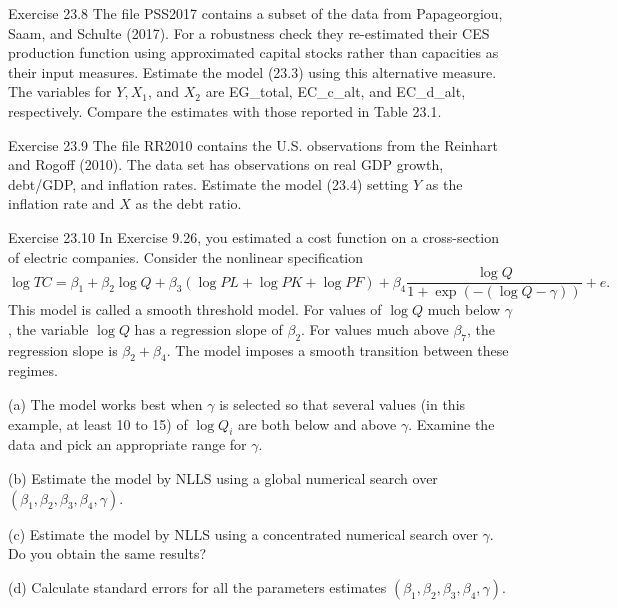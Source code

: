 \documentclass[10pt]{article}
\begin{document}
Exercise 23.8 The file PSS2017 contains a subset of the data from Papageorgiou, Saam, and Schulte (2017). For a robustness check they re-estimated their CES production function using approximated capital stocks rather than capacities as their input measures. Estimate the model (23.3) using this alternative measure. The variables for $Y, X_{1}$, and $X_{2}$ are EG\_total, EC\_c\_alt, and EC\_d\_alt, respectively. Compare the estimates with those reported in Table 23.1.

Exercise 23.9 The file RR2010 contains the U.S. observations from the Reinhart and Rogoff (2010). The data set has observations on real GDP growth, debt/GDP, and inflation rates. Estimate the model (23.4) setting $Y$ as the inflation rate and $X$ as the debt ratio.

Exercise 23.10 In Exercise 9.26, you estimated a cost function on a cross-section of electric companies. Consider the nonlinear specification
$$
\log T C=\beta_{1}+\beta_{2} \log Q+\beta_{3}(\log P L+\log P K+\log P F)+\beta_{4} \frac{\log Q}{1+\exp (-(\log Q-\gamma))}+e .
$$
This model is called a smooth threshold model. For values of $\log Q$ much below $\gamma$, the variable $\log Q$ has a regression slope of $\beta_{2}$. For values much above $\beta_{7}$, the regression slope is $\beta_{2}+\beta_{4}$. The model imposes a smooth transition between these regimes.

(a) The model works best when $\gamma$ is selected so that several values (in this example, at least 10 to 15) of $\log Q_{i}$ are both below and above $\gamma$. Examine the data and pick an appropriate range for $\gamma$.

(b) Estimate the model by NLLS using a global numerical search over $\left(\beta_{1}, \beta_{2}, \beta_{3}, \beta_{4}, \gamma\right)$.

(c) Estimate the model by NLLS using a concentrated numerical search over $\gamma$. Do you obtain the same results?

(d) Calculate standard errors for all the parameters estimates $\left(\beta_{1}, \beta_{2}, \beta_{3}, \beta_{4}, \gamma\right)$.
\end{document}
